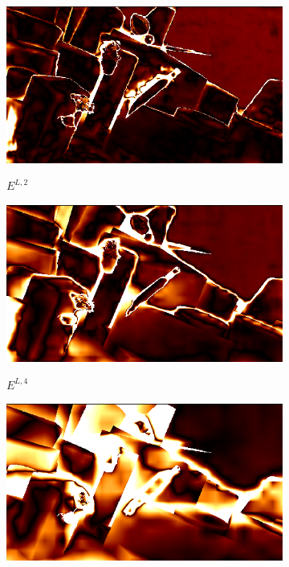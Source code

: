 \documentclass[10pt]{article}
\begin{document}
\begin{figure}[t]
{\begin{subfigure}[b]{0.28\textwidth}
        \includegraphics[width=\textwidth]{paper/latex/figures/pred_1_err.png}\\
        \vspace{-15pt}      
        \caption{$E^{L,2}$}
    \end{subfigure} 
    \hspace{0.001cm} 
    \begin{subfigure}[b]{0.28\textwidth}
        \includegraphics[width=\textwidth]{paper/latex/figures/pred_2_err.png}\\
        \vspace{-15pt}                      
        \caption{$E^{L,4}$}
    \end{subfigure} 
    \hspace{0.001cm} 
    \begin{subfigure}[b]{0.28\textwidth}
        \includegraphics[width=\textwidth]{paper/latex/figures/pred_3_err.png}\\

\end{subfigure}}
\end{figure}
\end{document}
